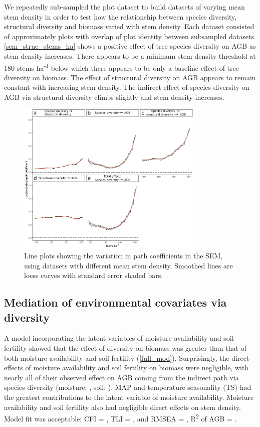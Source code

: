 \documentclass[11pt,a4paper]{article}
\begin{document}
We repeatedly sub-sampled the plot dataset to build \subn{} datasets of varying mean stem density in order to test how the relationship between species diversity, structural diversity and biomass varied with stem density. Each dataset consisted of approximately \subp{} plots with overlap of plot identity between subsampled datasets.  \autoref{sem_struc_stems_ha} shows a positive effect of tree species diversity on AGB as stem density increases. There appears to be a minimum stem density threshold at \textapprox{}180 stems ha\textsuperscript{-1} below which there appears to be only a baseline effect of tree diversity on biomass. The effect of structural diversity on AGB appears to remain constant with increasing stem density. The indirect effect of species diversity on AGB via structural diversity climbs slightly and stem density increases.

\begin{figure}[H]
\centering
	\includegraphics[width=0.8\textwidth]{sem_struc_stems_ha}
	\caption{Line plots showing the variation in path coefficients in the SEM, using datasets with different mean stem density. Smoothed lines are loess curves with standard error shaded bars.}
	\label{sem_struc_stems_ha}
\end{figure}

\subsection{Mediation of environmental covariates via diversity}

A model incorporating the latent variables of moisture availability and soil fertility showed that the effect of diversity on biomass was greater than that of both moisture availability and soil fertility (\autoref{full_mod}). Surprisingly, the direct effects of moisture availability and soil fertility on biomass were negligible, with nearly all of their observed effect on AGB coming from the indirect path via species diversity (moisture: \rgmbd{}, soil: \rgsbd{}). MAP and temperature seasonality (TS) had the greatest contributions to the latent variable of moisture availability. Moisture availability and soil fertility also had negligible direct effects on stem density.  Model fit was acceptable: CFI = \fmcfi{}, TLI = \fmtli{}, and RMSEA = \fmrmsea{}, R\textsuperscript{2} of AGB = \fmrsq{}.
\end{document}

